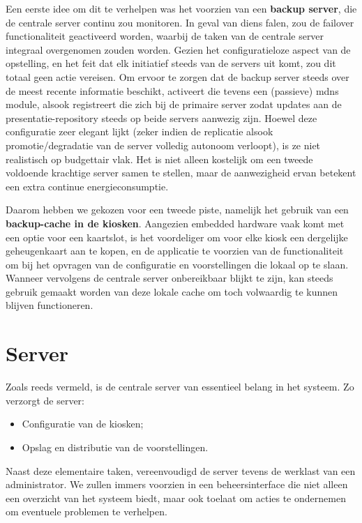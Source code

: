 Een eerste idee om dit te verhelpen was het voorzien van een \textbf{backup server}, die de centrale server continu zou monitoren. In geval van diens falen, zou de failover functionaliteit geactiveerd worden, waarbij de taken van de centrale server integraal overgenomen zouden worden. Gezien het configuratieloze aspect van de opstelling, en het feit dat elk initiatief steeds van de servers uit komt, zou dit totaal geen actie vereisen. Om ervoor te zorgen dat de backup server steeds over de meest recente informatie beschikt, activeert die tevens een (passieve) \ac{mdns} module, alsook registreert die zich bij de primaire server zodat updates aan de presentatie-repository steeds op beide servers aanwezig zijn.
Hoewel deze configuratie zeer elegant lijkt (zeker indien de replicatie alsook promotie/degradatie van de server volledig autonoom verloopt), is ze niet realistisch op budgettair vlak. Het is niet alleen kostelijk om een tweede voldoende krachtige server samen te stellen, maar de aanwezigheid ervan betekent een extra continue energieconsumptie.

Daarom hebben we gekozen voor een tweede piste, namelijk het gebruik van een \textbf{backup-cache in de kiosken}. Aangezien embedded hardware vaak komt met een optie voor een kaartslot, is het voordeliger om voor elke kiosk een dergelijke geheugenkaart aan te kopen, en de applicatie te voorzien van de functionaliteit om bij het opvragen van de configuratie en voorstellingen die lokaal op te slaan. Wanneer vervolgens de centrale server onbereikbaar blijkt te zijn, kan steeds gebruik gemaakt worden van deze lokale cache om toch volwaardig te kunnen blijven functioneren.

\section{Server}
\label{sec:server}

Zoals reeds vermeld, is de centrale server van essentieel belang in het systeem. Zo verzorgt de server:
\begin{itemize}
\item Configuratie van de kiosken;
\item Opslag en distributie van de voorstellingen.
\end{itemize}

Naast deze elementaire taken, vereenvoudigd de server tevens de werklast van een administrator. We zullen immers voorzien in een beheersinterface die niet alleen een overzicht van het systeem biedt, maar ook toelaat om acties te ondernemen om eventuele problemen te verhelpen.


